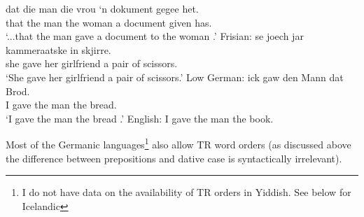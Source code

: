 \begin{exe}
\begin{xlist}
\gll dat die man die vrou `n dokument gegee het.\\
that the man the woman a document given has.\\
\trans `...that the man gave a document to the woman \citep{Louw.2012}.'
\ex Frisian:\label{ex:fri-rt}
\gll se joech jar kammeraatske in skjirre.\\
she gave her girlfriend a {pair of scissors}.\\
\trans `She gave her girlfriend a pair of scissors.'
\ex Low German: \label{ex:lg-rt}
\gll ick gaw den Mann dat Brod.\\
I gave the man the bread.\\
\trans `I gave the man the bread \citep{Mussaus.1829}.'
\ex English: I gave the man the book.\label{ex:eng-rt}
\end{xlist}
\end{exe}

Most of the Germanic languages\footnote{I do not have data on the availability of TR orders in Yiddish. See below for Icelandic} also allow TR word orders (as discussed above the difference between prepositions and dative case is syntactically irrelevant).

